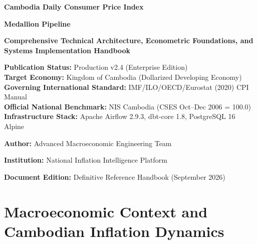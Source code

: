 \documentclass[11pt,a4paper,oneside]{article}
\begin{document}
\begin{titlepage}
    \centering
    \vspace*{1.5cm}
    
    {\Huge\bfseries\color{NavyBlue} Cambodia Daily Consumer Price Index\par}
    \vspace{0.3cm}
    {\Huge\bfseries\color{NavyBlue} Medallion Pipeline\par}
    \vspace{0.8cm}
    {\LARGE\bfseries\color{Teal} Comprehensive Technical Architecture, Econometric Foundations, and Systems Implementation Handbook\par}
    \vspace{1.5cm}
    
    \begin{tcolorbox}[colback=white,colframe=Teal,width=0.94\textwidth]
        \centering\normalsize
        \textbf{Publication Status:} Production v2.4 (Enterprise Edition)\\
        \textbf{Target Economy:} Kingdom of Cambodia (Dollarized Developing Economy)\\
        \textbf{Governing International Standard:} IMF/ILO/OECD/Eurostat (2020) CPI Manual\\
        \textbf{Official National Benchmark:} NIS Cambodia (CSES Oct--Dec 2006 = 100.0)\\
        \textbf{Infrastructure Stack:} Apache Airflow 2.9.3, dbt-core 1.8, PostgreSQL 16 Alpine
    \end{tcolorbox}
    
    \vfill
    
    {\large\textbf{Author:} Advanced Macroeconomic Engineering Team\par}
    {\large\textbf{Institution:} National Inflation Intelligence Platform\par}
    {\large\textbf{Document Edition:} Definitive Reference Handbook (September 2026)\par}
    \vspace{1cm}
\end{titlepage}

\tableofcontents
\newpage

\section{Macroeconomic Context and Cambodian Inflation Dynamics}
\end{document}

